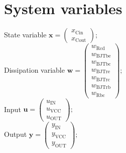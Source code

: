 \documentclass[11pt, oneside]{article}      %
\begin{document}
\section{System variables}
%
State variable $ \mathbf{x} = \left(\begin{array}{c}x_{\mathrm{Cin}}\\x_{\mathrm{Cout}}\end{array}\right) ; $ 
%
\\
%
Dissipation variable $ \mathbf{w} = \left(\begin{array}{c}w_{\mathrm{Rcd}}\\w_{\mathrm{BJTbe}}\\w_{\mathrm{BJTbc}}\\w_{\mathrm{BJTre}}\\w_{\mathrm{BJTrc}}\\w_{\mathrm{BJTrb}}\\w_{\mathrm{Rbc}}\end{array}\right) ; $ 
%
\\
%
Input $ \mathbf{u} = \left(\begin{array}{c}u_{\mathrm{IN}}\\u_{\mathrm{VCC}}\\u_{\mathrm{OUT}}\end{array}\right) ; $ 
%
\\
%
Output $ \mathbf{y} = \left(\begin{array}{c}y_{\mathrm{IN}}\\y_{\mathrm{VCC}}\\y_{\mathrm{OUT}}\end{array}\right) ; $ 
%
\\
%
%
\end{document}
